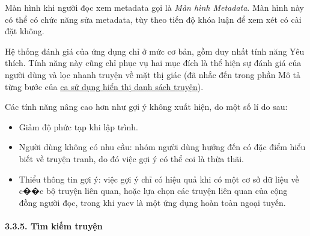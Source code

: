 Màn hình khi người đọc xem metadata gọi là \emph{Màn hình Metadata}. Màn
hình này có thể có chức năng sửa metadata, tùy theo tiến độ khóa luận để
xem xét có cài đặt không.

Hệ thống đánh giá của ứng dụng chỉ ở mức cơ bản, gồm duy nhất tính năng
Yêu thích. Tính năng này cũng chỉ phục vụ hai mục đích là thể hiện sự
đánh giá của người dùng và lọc nhanh truyện về mặt thị giác (đã nhắc đến
trong phần Mô tả từng bước của
\protect\hyperlink{P3.3.2-show-library}{ca sử dụng hiển thị danh sách
  truyện}).

Các tính năng nâng cao hơn như gợi ý không xuất hiện, do một số lí do
sau:

\begin{itemize}
  
  \item
        Giảm độ phức tạp khi lập trình.
  \item
        Người dùng không có nhu cầu: nhóm người dùng hướng đến có đặc điểm
        hiểu biết về truyện tranh, do đó việc gợi ý có thể coi là thừa thãi.
  \item
        Thiểu thông tin gợi ý: việc gợi ý chỉ có hiệu quả khi có một cơ sở dữ
        liệu về c��c bộ truyện liên quan, hoặc lựa chọn các truyện liên quan
        của cộng đồng người đọc, trong khi yacv là một ứng dụng hoàn toàn
        ngoại tuyến.
\end{itemize}

\hypertarget{tuxecm-kiux1ebfm-truyux1ec7n}{%
  \paragraph{\texorpdfstring{3.3.5. Tìm kiếm truyện
    }{3.3.5. Tìm kiếm truyện }}\label{tuxecm-kiux1ebfm-truyux1ec7n}}

